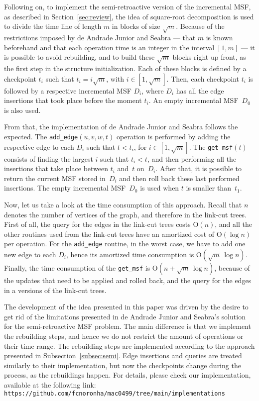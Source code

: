 \documentclass[reqno,11pt]{amsart}
\newcommand{\Oh}{\mathrm{O}}
\begin{document}
Following on, to implement the semi-retroactive version of the incremental MSF, 
as described in Section~\ref{sec:review}, the idea of square-root decomposition 
is used to divide the time line of length $m$ in blocks of size $\sqrt{m}$. 
Because of the restrictions imposed by de Andrade Junior and Seabra --- 
that $m$ is known beforehand and that each operation time is an integer in 
the interval $[1, m]$ --- it is possible to avoid rebuilding, and to build 
these $\sqrt{m}$ blocks right up front, as the first step in the structure 
initialization.  Each of these blocks is defined by a checkpoint $t_i$ such 
that $t_i = i \sqrt{m}$, with $i \in [1, \sqrt{m}]$. Then, each checkpoint 
$t_i$ is followed by a respective incremental MSF $D_i$, where $D_i$ has 
all the edge insertions that took place before the moment $t_i$.
An empty incremental MSF~$D_0$ is also used.

From that, the implementation of de Andrade Junior and Seabra follows 
the expected.  The \texttt{add\_edge}$(u,v,w,t)$ operation is performed 
by adding the respective edge to each $D_i$ such that $t < t_i$, for
$i \in [1,\sqrt{m}]$.  The \texttt{get\_msf}$(t)$ consists of finding 
the largest $i$ such that $t_i < t$, and then performing all the 
insertions that take place between $t_i$ and~$t$ on~$D_i$.
After that, it is possible to return the current MSF stored 
in~$D_i$ and then roll back these last performed insertions.
The empty incremental MSF~$D_0$ is used when $t$ is smaller than~$t_1$.

Now, let us take a look at the time consumption of this approach.
Recall that $n$ denotes the number of vertices of the graph, 
and therefore in the link-cut trees.  First of all, the query for 
the edges in the link-cut trees costs $\Oh(n)$, and all the other 
routines used from the link-cut trees have an amortized cost of 
$\Oh(\log{n})$ per operation.  For the \texttt{add\_edge} routine, 
in the worst case, we have to add one new edge to each $D_i$, hence 
its amortized time consumption is $\Oh(\sqrt{m}\,\log{n})$. Finally, 
the time consumption of the \texttt{get\_msf} is $\Oh(n+\sqrt{m}\,\log{n})$,
because of the updates that need to be applied and rolled back, 
and the query for the edges in a versions of the link-cut trees.

\medskip

The development of the idea presented in this paper was driven by
the desire to get rid of the limitations presented in de Andrade 
Junior and Seabra's solution for the semi-retroactive MSF problem.  
The main difference is that we implement the rebuilding steps, 
and hence we do not restrict the amount of operations or their time range.
The rebuilding steps are implemented according to 
the approach presented in Subsection~\ref{subsec:semi}.
Edge insertions and queries are treated similarly to their implementation, 
but now the checkpoints change during the process, as the rebuildings happen.
For details, please check our implementation, available at the following link: \\
{\small \texttt{https://github.com/fcnoronha/mac0499/tree/main/implementations}}
\end{document}
